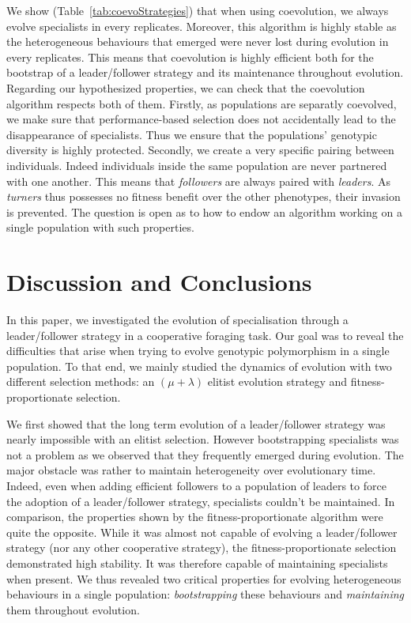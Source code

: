   We show (Table~\ref{tab:coevoStrategies}) that when using coevolution, we always evolve specialists in every replicates. Moreover, this algorithm is highly stable as the heterogeneous behaviours that emerged were never lost during evolution in every replicates. This means that coevolution is highly efficient both for the bootstrap of a leader/follower strategy and its maintenance throughout evolution. Regarding our hypothesized properties, we can check that the coevolution algorithm respects both of them. Firstly, as populations are separatly coevolved, we make sure that performance-based selection does not accidentally lead to the disappearance of specialists. Thus we ensure that the populations' genotypic diversity is highly protected. Secondly, we create a very specific pairing between individuals. Indeed individuals inside the same population are never partnered with one another. This means that \emph{followers} are always paired with \emph{leaders}. As \emph{turners} thus possesses no fitness benefit over the other phenotypes, their invasion is prevented. The question is open as to how to endow an algorithm working on a single population with such properties.

\section{Discussion and Conclusions}
\label{sec:discussion}
  In this paper, we investigated the evolution of specialisation through a leader/follower strategy in a cooperative foraging task. Our goal was to reveal the difficulties that arise when trying to evolve genotypic polymorphism in a single population. To that end, we mainly studied the dynamics of evolution with two different selection methods: an \((\mu + \lambda)\) elitist evolution strategy and fitness-proportionate selection.

  We first showed that the long term evolution of a leader/follower strategy was nearly impossible with an elitist selection. However bootstrapping specialists was not a problem as we observed that they frequently emerged during evolution. The major obstacle was rather to maintain heterogeneity over evolutionary time. Indeed, even when adding efficient followers to a population of leaders to force the adoption of a leader/follower strategy, specialists couldn't be maintained. In comparison, the properties shown by the fitness-proportionate algorithm were quite the opposite. While it was almost not capable of evolving a leader/follower strategy (nor any other cooperative strategy), the fitness-proportionate selection demonstrated high stability. It was therefore capable of maintaining specialists when present. We thus revealed two critical properties for evolving heterogeneous behaviours in a single population: \emph{bootstrapping} these behaviours and \emph{maintaining} them throughout evolution.

